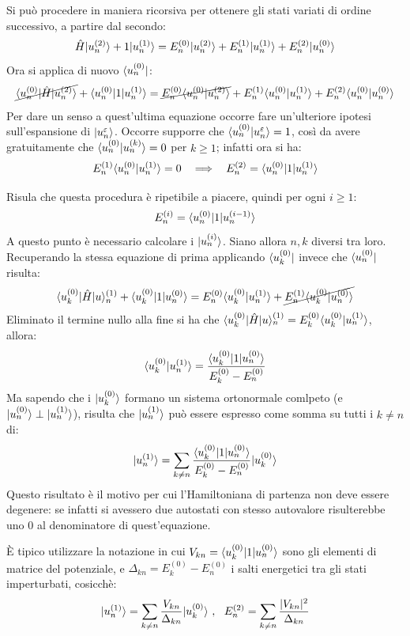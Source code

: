 Si può procedere in maniera ricorsiva per ottenere gli stati variati di ordine successivo, a partire dal secondo:
\[
	\H \Ket {u_n^{(2)}} + \V \Ket {u_n^{(1)}} = E_n^{(0)} \Ket {u_n^{(2)}} + E_n^{(1)} \Ket {u_n^{(1)}} + E_n^{(2)} \Ket {u_n^{(0)}}
\]
Ora si applica di nuovo $\bra u_n^{(0)}|$:
\[
	\cancel{\bra u_n^{(0)}| \H \Ket {u_n^{(2)}}} + \Bra {u_n^{(0)}} \V \Ket {u_n^{(1)}} = \cancel{E_n^{(0)} \bra u_n^{(0)}| u_n^{(2)}\ket} + E_n^{(1)} \bra u_n^{(0)}| u_n^{(1)}\ket + E_n^{(2)} \bra u_n^{(0)}| u_n^{(0)}\ket
\]
Per dare un senso a quest'ultima equazione occorre fare un'ulteriore ipotesi sull'espansione di $\Ket {u_n^\varepsilon}$. Occorre supporre che $\braket{u_n^{(0)}}{u_n^\varepsilon} = 1$, così da avere gratuitamente che $\braket{u_n^{(0)}}{u_n^{(k)}} = 0$ per $k \geq 1$; infatti ora si ha:
\[
	E_n^{(1)} \bra u_n^{(0)}| u_n^{(1)}\ket = 0 \ \ \implies \ \ E_n^{(2)} = \Bra{u_n^{(0)}} \V \Ket{u_n^{(1)}}
\]

Risula che questa procedura è ripetibile a piacere, quindi per ogni $i \geq 1$:
\[
	E_n^{(i)} = \Bra{u_n^{(0)}} \V \Ket{u_n^{(i - 1)}}
\]
A questo punto è necessario calcolare i $\Ket{u_n^{(i)}}$. Siano allora $n, k$ diversi tra loro. Recuperando la stessa equazione di prima applicando $\Bra {u_k^{(0)}}$ invece che  $\Bra {u_n^{(0)}}$ risulta:
\[
	\Bra {u_k^{(0)}} \H \Ket u_n^{(1)} + \Bra {u_k^{(0)}} \V \Ket {u_n^{(0)}} = E_n^{(0)} \braket {u_k^{(0)}} {u_n^{(1)}} + \cancel{E_n^{(1)} \braket {u_k^{(0)}} {u_n^{(0)}}}
\]
Eliminato il termine nullo alla fine si ha che $\Bra {u_k^{(0)}} \H \Ket u_n^{(1)} = E_k^{(0)} \braket {u_k^{(0)}} {u_n^{(1)}}$, allora:
\[
	\braket {u_k^{(0)}} {u_n^{(1)}} = \frac{\Bra {u_k^{(0)}} \V \Ket {u_n^{(0)}}}{E_k^{(0)} - E_n^{(0)}}
\]
Ma sapendo che i $\Ket{u_k^{(0)}}$ formano un sistema ortonormale comlpeto (e $\Ket{u_n^{(0)}} \perp \Ket{u_n^{(1)}}$), risulta che $\Ket{u_n^{(1)}}$ può essere espresso come somma su tutti i $k\neq n$ di:
\[
	\Ket {u_n^{(1)}} = \sum_{k \neq n} \frac{\Bra {u_k^{(0)}} \V \Ket {u_n^{(0)}}}{E_k^{(0)} - E_n^{(0)}} \Ket {u_k^{(0)}}
\]
Questo risultato è il motivo per cui l'Hamiltoniana di partenza non deve essere degenere: se infatti si avessero due autostati con stesso autovalore risulterebbe uno 0 al denominatore di quest'equazione.

È tipico utilizzare la notazione in cui $V_{kn} = \Bra {u_k^{(0)}} \V \Ket {u_n^{(0)}}$ sono gli elementi di matrice del potenziale, e $\Delta_{kn} = E_k^{(0)} - E_n^{(0)}$ i salti energetici tra gli stati imperturbati, cosicchè:
\[
	\Ket {u_n^{(1)}} = \sum_{k \neq n} \frac{V_{kn}}{\Delta_{kn}}\Ket {u_k^{(0)}}\ , \ \ E_n^{(2)} = \sum_{k \neq n} \frac{\sabs{V_{kn}}}{\Delta_{kn}}
\]

